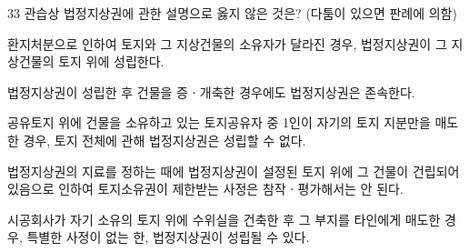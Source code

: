\begin{question}{33}
관습상 법정지상권에 관한 설명으로 옳지 않은 것은? (다툼이 있으면 판례에 의함)
\begin{choices}
  \item 환지처분으로 인하여 토지와 그 지상건물의 소유자가 달라진 경우, 법정지상권이 그 지상건물의 토지 위에 성립한다.
  \item 법정지상권이 성립한 후 건물을 증ㆍ개축한 경우에도 법정지상권은 존속한다.
  \item 공유토지 위에 건물을 소유하고 있는 토지공유자 중 1인이 자기의 토지 지분만을 매도한 경우, 토지 전체에 관해 법정지상권은 성립할 수 없다.
  \item 법정지상권의 지료를 정하는 때에 법정지상권이 설정된 토지 위에 그 건물이 건립되어 있음으로 인하여 토지소유권이 제한받는 사정은 참작ㆍ평가해서는 안 된다.
  \item 시공회사가 자기 소유의 토지 위에 수위실을 건축한 후 그 부지를 타인에게 매도한 경우, 특별한 사정이 없는 한, 법정지상권이 성립될 수 있다.
\end{choices}
\end{question}

